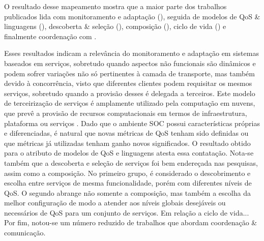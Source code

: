 O resultado desse mapeamento mostra que a maior parte dos trabalhos publicados lida com monitoramento e adapta\c{c}\~{a}o (\MonitoramentoAdaptacao), seguida de modelos de QoS \& linguagens (\ModelosdeQoSeLinguagens), descoberta \& sele\c{c}\~{a}o (\DescobrimentoSelecao),  composi\c{c}\~{a}o (\Composicao), ciclo de vida (\Ciclodevida) e finalmente coordenação com \CoodenacaoComunicacao.

Esses resultados indicam a relevância do monitoramento e adaptação em sistemas baseados em serviços, sobretudo quando aspectos não funcionais  são dinâmicos e podem sofrer variações não só pertinentes à camada de transporte, mas também devido à concorrência, visto que diferentes clientes podem requisitar os mesmos serviços, sobretudo quando a provisão desses é delegada a terceiros. Este modelo de terceirização de serviços é amplamente utilizado pela computação em nuvens, que prevê a provisão de recursos computacionais em termos de infraestrutura, plataforma ou serviços \cite{10.1109/MIC.2010.147}. Dado que o ambiente SOC possui características próprias e diferenciadas, é natural que novas métricas de QoS tenham sido definidas ou que métricas já utilizadas tenham ganho novos significados. O resultado obtido para o atributo de modelos de QoS e linguagens atesta essa contatação. Nota-se também que a descoberta e seleção de serviços foi bem endereçada nas pesquisas, assim como a composição. No primeiro grupo, é considerado o descobrimento e escolha entre serviços de mesma funcionalidade, porém com diferentes níveis de QoS. O segundo abrange não somente a composição, mas também a escolha da melhor configuração de modo a atender aos níveis globais desejáveis ou necessários de QoS para um conjunto de serviços. Em relação a ciclo de vida... Por fim, notou-se um número reduzido de trabalhos que abordam coordenação \& comunicação. 


